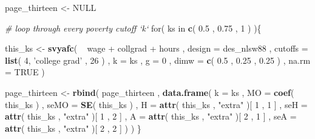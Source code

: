 \documentclass[]{book}
\newenvironment{Shaded}{\begin{snugshade}}{\end{snugshade}}
\newcommand{\KeywordTok}[1]{\textcolor[rgb]{0.13,0.29,0.53}{\textbf{{#1}}}}
\newcommand{\DataTypeTok}[1]{\textcolor[rgb]{0.13,0.29,0.53}{{#1}}}
\newcommand{\DecValTok}[1]{\textcolor[rgb]{0.00,0.00,0.81}{{#1}}}
\newcommand{\FloatTok}[1]{\textcolor[rgb]{0.00,0.00,0.81}{{#1}}}
\newcommand{\StringTok}[1]{\textcolor[rgb]{0.31,0.60,0.02}{{#1}}}
\newcommand{\CommentTok}[1]{\textcolor[rgb]{0.56,0.35,0.01}{\textit{{#1}}}}
\newcommand{\OtherTok}[1]{\textcolor[rgb]{0.56,0.35,0.01}{{#1}}}
\newcommand{\NormalTok}[1]{{#1}}
\theoremstyle{definition}
\theoremstyle{definition}
\theoremstyle{remark}
\begin{document}
\begin{Shaded}
\begin{Highlighting}[]
\NormalTok{page_thirteen <-}\StringTok{ }\OtherTok{NULL}

\CommentTok{# loop through every poverty cutoff `k`}
\NormalTok{for( ks in }\KeywordTok{c}\NormalTok{( }\FloatTok{0.5} \NormalTok{, }\FloatTok{0.75} \NormalTok{, }\DecValTok{1} \NormalTok{) )\{}
    
    \NormalTok{this_ks <-}
\StringTok{        }\KeywordTok{svyafc}\NormalTok{(}
        \NormalTok{~}\StringTok{ }\NormalTok{wage +}\StringTok{ }\NormalTok{collgrad +}\StringTok{ }\NormalTok{hours , }
        \DataTypeTok{design =} \NormalTok{des_nlsw88 , }
        \DataTypeTok{cutoffs =} \KeywordTok{list}\NormalTok{( }\DecValTok{4}\NormalTok{, }\StringTok{'college grad'} \NormalTok{, }\DecValTok{26} \NormalTok{) , }
        \DataTypeTok{k =} \NormalTok{ks , }
        \DataTypeTok{g =} \DecValTok{0} \NormalTok{, }
        \DataTypeTok{dimw =} \KeywordTok{c}\NormalTok{( }\FloatTok{0.5} \NormalTok{, }\FloatTok{0.25} \NormalTok{, }\FloatTok{0.25} \NormalTok{) ,}
        \DataTypeTok{na.rm =} \OtherTok{TRUE}
      \NormalTok{)}
    
    \NormalTok{page_thirteen <-}
\StringTok{        }\KeywordTok{rbind}\NormalTok{(}
            \NormalTok{page_thirteen ,}
            \KeywordTok{data.frame}\NormalTok{( }
                \DataTypeTok{k =} \NormalTok{ks , }
                \DataTypeTok{MO =} \KeywordTok{coef}\NormalTok{( this_ks ) ,}
                \DataTypeTok{seMO =} \KeywordTok{SE}\NormalTok{( this_ks ) ,}
                \DataTypeTok{H =} \KeywordTok{attr}\NormalTok{( this_ks , }\StringTok{"extra"} \NormalTok{)[ }\DecValTok{1} \NormalTok{, }\DecValTok{1} \NormalTok{] ,}
                \DataTypeTok{seH =} \KeywordTok{attr}\NormalTok{( this_ks , }\StringTok{"extra"} \NormalTok{)[ }\DecValTok{1} \NormalTok{, }\DecValTok{2} \NormalTok{] ,}
                \DataTypeTok{A =} \KeywordTok{attr}\NormalTok{( this_ks , }\StringTok{"extra"} \NormalTok{)[ }\DecValTok{2} \NormalTok{, }\DecValTok{1} \NormalTok{] ,}
                \DataTypeTok{seA =} \KeywordTok{attr}\NormalTok{( this_ks , }\StringTok{"extra"} \NormalTok{)[ }\DecValTok{2} \NormalTok{, }\DecValTok{2} \NormalTok{]}
          \NormalTok{)}
        \NormalTok{)}
\NormalTok{\}}
\end{Highlighting}
\end{Shaded}
\end{document}
